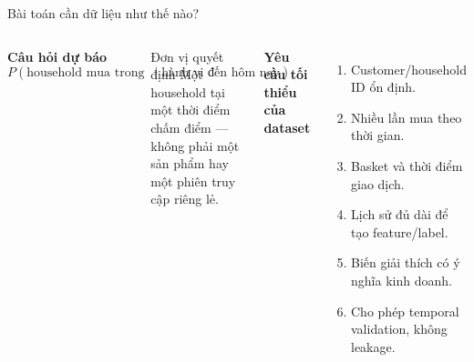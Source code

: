 \documentclass[aspectratio=169,11pt]{beamer}
\begin{document}
\begin{frame}{Bài toán cần dữ liệu như thế nào?}
  \begin{columns}[T,onlytextwidth]
      \textbf{Câu hỏi dự báo}
      \[
        P(\text{household mua trong 7 ngày tới}
        \mid \text{hành vi đến hôm nay})
      \]
      \vspace{0.2cm}
      \begin{alertblock}{Đơn vị quyết định}
        Một household tại một thời điểm chấm điểm --- không phải một sản phẩm
        hay một phiên truy cập riêng lẻ.
      \end{alertblock}
      \textbf{Yêu cầu tối thiểu của dataset}
      \begin{enumerate}
        \item Customer/household ID ổn định.
        \item Nhiều lần mua theo thời gian.
        \item Basket và thời điểm giao dịch.
        \item Lịch sử đủ dài để tạo feature/label.
        \item Biến giải thích có ý nghĩa kinh doanh.
        \item Cho phép temporal validation, không leakage.
      \end{enumerate}
  \end{columns}
\end{frame}
\end{document}
